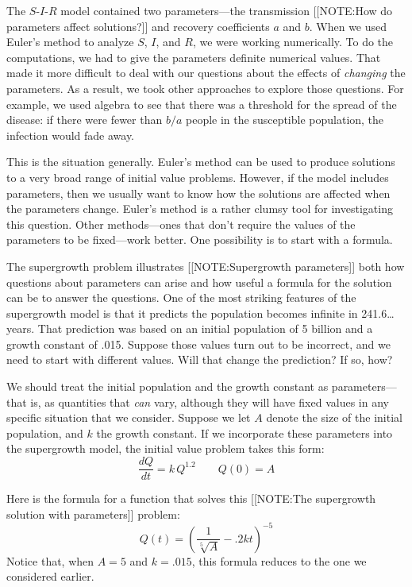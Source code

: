 \label{DEs w/ params-begin}

The $S$-$I$-$R$ model contained two parameters---the transmission 
[[NOTE:How do parameters affect solutions?]]
and recovery coefficients $a$ and $b$. When we used
Euler's method to analyze $S$, $I$, and $R$, we were working
numerically.  To do the computations, we had to give the parameters
definite numerical values.  That made it more difficult to deal with
our questions about the effects of {\em changing\/} the parameters.
As a result, we took other approaches to explore those questions.  For
example, we used algebra to see that there was a threshold for the
spread of the disease: if there were fewer than $b/a$ people in the
susceptible population, the infection would fade away.

This is the situation generally.  Euler's method can be used to
produce solutions to a very broad range of initial value problems.
However, if the model includes parameters, then we usually want to
know how the solutions are affected when the parameters change.
Euler's method is a rather clumsy tool for investigating this
question.  Other methods---ones that don't require the values of the
parameters to be fixed---work better.  One possibility is to start
with a formula.



The supergrowth problem illustrates 
[[NOTE:Supergrowth parameters]]
both how questions about parameters can arise and how useful a formula
for the solution can be to answer the questions.  One of the most
striking features of the supergrowth model is that it predicts the
population becomes infinite in 241.6\ldots years.  That prediction was
based on an initial population of 5 billion and a growth constant of
.015.  Suppose those values turn out to be incorrect, and we need to
start with different values.  Will that change the prediction?  If so,
how?

We should treat the initial population and the growth constant as
parameters---that is, as quantities that {\em can\/} vary, although
they will have fixed values in any specific situation that we
consider.  Suppose we let $A$ denote the size of the initial
population, and $k$ the growth constant.  If we incorporate these
parameters into the supergrowth model, the initial value problem takes
this form:
	\[
\dfrac{dQ}{dt} = k\, Q^{1.2} \qquad Q(0) = A
\]


Here is the formula for a function that solves this 
	[[NOTE:The supergrowth solution with parameters]]
problem:\label{supergrowth soln}
	\[
Q(t) =\left( \frac{1}{\sqrt[5]{A}} -.2kt \right)^{-5}
\]
Notice that, when $A = 5$ and $k = .015$, this formula reduces to the one we considered earlier.

